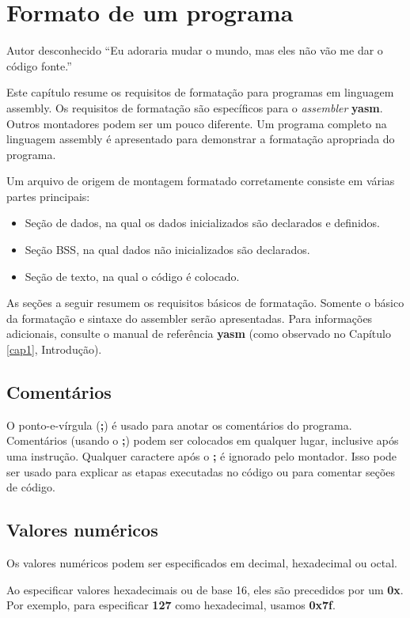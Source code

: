 \chapter{Formato de um programa}

\begin{chapquote}{Autor desconhecido}
``Eu adoraria mudar o mundo, mas eles não vão me dar o código fonte.''
\end{chapquote}
Este capítulo resume os requisitos de formatação para programas em linguagem assembly. Os requisitos de formatação são específicos para o  \textit{assembler} \textbf{yasm}. Outros montadores podem
ser um pouco diferente. Um programa completo na linguagem assembly é apresentado para demonstrar a formatação apropriada do programa.

Um arquivo de origem de montagem formatado corretamente consiste em várias partes principais:
\begin{itemize}
	\item Seção de dados, na qual os dados inicializados são declarados e definidos.
	\item Seção BSS, na qual dados não inicializados são declarados.
	\item Seção de texto, na qual o código é colocado.
\end{itemize}

As seções a seguir resumem os requisitos básicos de formatação. Somente o básico da formatação e sintaxe do assembler serão apresentadas. Para informações adicionais, consulte o
manual de referência \textbf{yasm} (como observado no Capítulo \ref{cap1}, Introdução).

\section{Comentários}
O ponto-e-vírgula (\textbf{;}) é usado para anotar os comentários do programa. Comentários (usando o \textbf{;}) podem ser
colocados em qualquer lugar, inclusive após uma instrução. Qualquer caractere após o \textbf{;} é ignorado pelo montador. Isso pode ser usado para explicar as etapas executadas no código ou para comentar
seções de código.

\section{Valores numéricos}
Os valores numéricos podem ser especificados em decimal, hexadecimal ou octal. 

Ao especificar valores hexadecimais ou de base 16, eles são precedidos por um \textbf{0x}. Por exemplo, para especificar \textbf{127} como hexadecimal, usamos \textbf{0x7f}.

